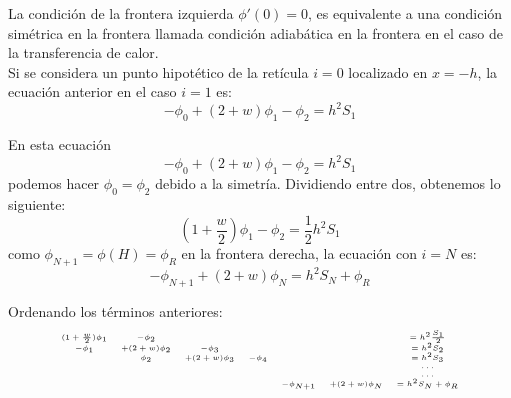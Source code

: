 \begin{frame}
La condici\'{o}n de la frontera izquierda $\phi'(0) = 0$, es equivalente a una condici\'{o}n sim\'{e}trica en la frontera llamada condici\'{o}n adiab\'{a}tica en la frontera en el caso de la transferencia de calor.
\\
\bigskip
Si se considera un punto hipot\'{e}tico de la ret\'{i}cula $i = 0$ localizado en $x = -h$, la ecuaci\'{o}n anterior en el caso $i = 1$ es:
\[-\phi_{0} + (2+w)\phi_{1} - \phi_{2} = h^{2}S_{1} \]
\end{frame}
\begin{frame}
En esta ecuaci\'{o}n
\[-\phi_{0} + (2+w)\phi_{1} - \phi_{2} = h^{2}S_{1} \]
podemos hacer $\phi_{0} = \phi_{2}$ debido a la simetr\'{i}a. Dividiendo entre dos, obtenemos lo siguiente:
\[ (1 + \dfrac{w}{2}) \phi_{1} - \phi_{2} = \dfrac{1}{2} h^{2}S_{1}\]
como $\phi_{N+1}= \phi(H)=\phi_{R}$ en la frontera derecha, la ecuaci\'{o}n con $i=N$ es:
\[ -\phi_{N+1} + (2+w) \phi_{N} = h^{2}S_{N} + \phi_{R}\]
\end{frame}
\begin{frame}
Ordenando los t\'{e}rminos anteriores:
\[ \tiny{\begin{matrix}
(1+\frac{w}{2})\phi_{1} & -\phi_{2}      &                &           &            & & = h^{2}\frac{S_{1}}{2} \\
-\phi_{1}               & +(2+w)\phi_{2} & -\phi_{3}      &           &            & & = h^{2}S_{2} \\
                        & \phi_{2}       & +(2+w)\phi_{3} & -\phi_{4} &            & & = h^{2}S_{3} \\
                        &                &                &           &            & & \ldots \\
                        &                &                &           &            & & \ldots \\
                        &                &                &           &-\phi_{N+1} & +(2+w)\phi_{N} & = h^{2}S_{N}+\phi_{R} 
\end{matrix}} \]
\end{frame}
